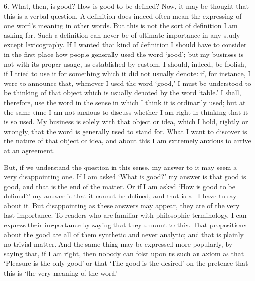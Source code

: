 6. What, then, is good? How is good to be defined? Now, it may be
thought that this is a verbal question. A definition does indeed often
mean the expressing of one word's meaning in other words. But this is
not the sort of definition I am asking for. Such a definition can
never be of ultimate importance in any study except lexicography. If I
wanted that kind of definition I should have to consider in the first
place how people generally used the word `good'; but my business is
not with its proper usage, as established by custom. I should, indeed,
be foolish, if I tried to use it for something which it did not
usually denote: if, for instance, I were to announce that, whenever I
used the word `good,' I must be understood to be thinking of that
object which is usually denoted by the word `table.' I shall,
therefore, use the word in the sense in which I think it is ordinarily
used; but at the same time I am not anxious to discuss whether I am
right in thinking that it is so used. My business is solely with that
object or idea, which I hold, rightly or wrongly, that the word is
generally used to stand for. What I want to discover is the nature of
that object or idea, and about this I am extremely anxious to arrive
at an agreement.

But, if we understand the question in this sense, my answer to it may
seem a very disappointing one. If I am asked `What is good?' my answer
is that good is good, and that is the end of the matter. Or if I am
asked `How is good to be defined?' my answer is that it cannot be
defined, and that is all I have to say about it. But disappointing as
these answers may appear, they are of the very last importance. To
readers who are familiar with philosophic terminology, I can express
their im-portance by saying that they amount to this: That
propositions about the good are all of them synthetic and never
analytic; and that is plainly no trivial matter. And the same thing
may be expressed more popularly, by saying that, if I am right, then
nobody can foist upon us such an axiom as that `Pleasure is the only
good' or that `The good is the desired' on the pretence that this is
`the very meaning of the word.'

